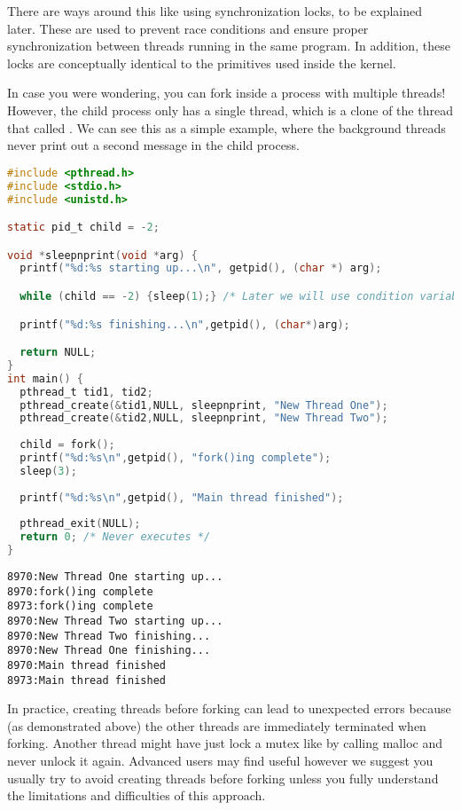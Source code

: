 There are ways around this like using synchronization locks, to be explained later.
These are used to prevent race conditions and ensure proper synchronization between threads running in the same program.
In addition, these locks are conceptually identical to the primitives used inside the kernel.

In case you were wondering, you can fork inside a process with multiple threads!
However, the child process only has a single thread, which is a clone of the thread that called .
We can see this as a simple example, where the background threads never print out a second message in the child process.

\begin{lstlisting}[language=C]
#include <pthread.h>
#include <stdio.h>
#include <unistd.h>

static pid_t child = -2;

void *sleepnprint(void *arg) {
  printf("%d:%s starting up...\n", getpid(), (char *) arg);

  while (child == -2) {sleep(1);} /* Later we will use condition variables */

  printf("%d:%s finishing...\n",getpid(), (char*)arg);

  return NULL;  
}
int main() {
  pthread_t tid1, tid2;
  pthread_create(&tid1,NULL, sleepnprint, "New Thread One");
  pthread_create(&tid2,NULL, sleepnprint, "New Thread Two");
  
  child = fork();
  printf("%d:%s\n",getpid(), "fork()ing complete");
  sleep(3);
    
  printf("%d:%s\n",getpid(), "Main thread finished");
  
  pthread_exit(NULL);
  return 0; /* Never executes */
}
\end{lstlisting}

\begin{verbatim}
8970:New Thread One starting up...
8970:fork()ing complete
8973:fork()ing complete
8970:New Thread Two starting up...
8970:New Thread Two finishing...
8970:New Thread One finishing...
8970:Main thread finished
8973:Main thread finished
\end{verbatim}

In practice, creating threads before forking can lead to unexpected errors because (as demonstrated above) the other threads are immediately terminated when forking.
Another thread might have just lock a mutex like by calling malloc and never unlock it again.
Advanced users may find  useful however we suggest you usually try to avoid creating threads before forking unless you fully understand the limitations and difficulties of this approach.

